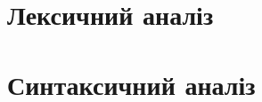 \documentclass[a4paper, 12pt]{book}
\begin{document}
\tableofcontents \newpage

\chapter{Лексичний аналіз}

 \newpage

 \newpage

 \newpage

 \newpage

 \newpage



\chapter{Синтаксичний аналіз}

 \newpage

 \newpage

 \newpage

 \newpage

 \newpage


\end{document}
